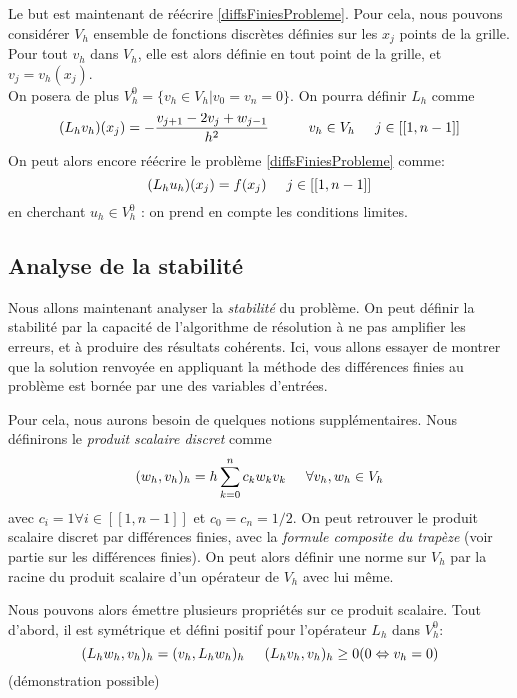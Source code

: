 \documentclass[12pt]{article}
\newcommand{\espace}{\hspace{5mm}}
\begin{document}
Le but est maintenant de réécrire \eqref{diffsFiniesProbleme}. Pour cela, nous pouvons considérer $V_h$ ensemble de fonctions discrètes définies sur les $x_j$ points de la grille. Pour tout $v_h$ dans $V_h$, elle est alors définie en tout point de la grille, et $v_j = v_h(x_j)$.\\ On posera de plus $V_h^0 = \{v_h \in V_h | v_0 = v_n = 0\}$.
On pourra définir $L_h$ comme
\begin{equation} \label{notationvj}
	(L_h v_h)(x_j) = - \frac{v_{j+1} - 2v_j + w_{j-1}}{h^2} \espace \espace v_h \in V_h \espace j \in [[1, n-1]]
\end{equation}
On peut alors encore réécrire le problème \eqref{diffsFiniesProbleme} comme:
\begin{equation} \label{diffFiniesAvecL}
	(L_h u_h)(x_j) = f(x_j) \espace j \in [[1, n-1]]
\end{equation}
en cherchant $u_h \in V_h^0$ : on prend en compte les conditions limites.

\subsection{Analyse de la stabilité}
Nous allons maintenant analyser la \emph{stabilité} du problème. On peut définir la stabilité par la capacité de l'algorithme de résolution à ne pas amplifier les erreurs, et à produire des résultats cohérents. Ici, vous allons essayer de montrer que la solution renvoyée en appliquant la méthode des différences finies au problème est bornée par une des variables d'entrées.

Pour cela, nous aurons besoin de quelques notions supplémentaires. Nous définirons le \emph{produit scalaire discret} comme
\begin{equation} \label{produitScalaireDiscret}
	(w_h, v_h)_h = h \sum_{k = 0}^n c_k w_k v_k \espace \forall v_h, w_h \in V_h
\end{equation}
avec $c_i= 1 \forall i \in [[1, n-1]]$ et $c_0 = c_n = 1/2$. On peut retrouver le produit scalaire discret par différences finies, avec la \emph{formule composite du trapèze} (voir partie sur les différences finies). On peut alors définir une norme sur $V_h$ par la racine du produit scalaire d'un opérateur de $V_h$ avec lui même.

Nous pouvons alors émettre plusieurs propriétés sur ce produit scalaire. Tout d'abord, il est symétrique et défini positif pour l'opérateur $L_h$ dans $V_h^0$:
\begin{equation}
	(L_h w_h, v_h)_h = (v_h, L_h w_h)_h \espace (L_h v_h, v_h)_h \ge 0 (0 \Leftrightarrow v_h = 0)
\end{equation}
(démonstration possible)
\end{document}
